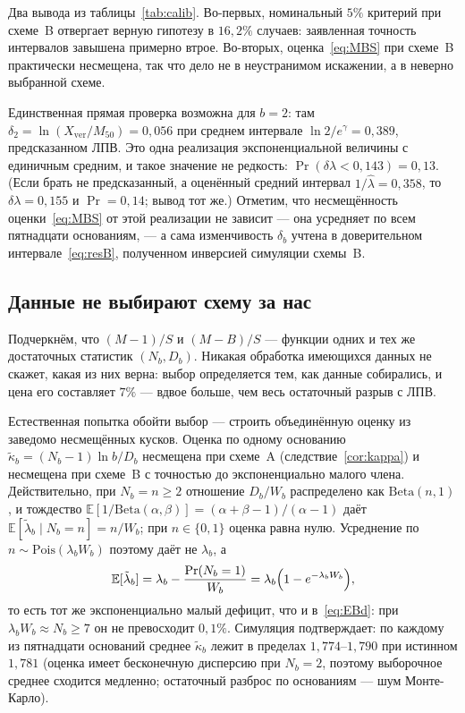 \documentclass[11pt,a4paper]{article}
\theoremstyle{plain}
\theoremstyle{remark}
\newcommand{\eg}{e^{\gamma}}
\begin{document}
Два вывода из таблицы~\ref{tab:calib}. Во-первых, номинальный $5\%$ критерий при
схеме~B отвергает верную гипотезу в $16{,}2\%$ случаев: заявленная точность интервалов
завышена примерно втрое. Во-вторых, оценка~\eqref{eq:MBS} при схеме~B практически
несмещена, так что дело не в неустранимом искажении, а в неверно выбранной схеме.

Единственная прямая проверка возможна для $b=2$: там
$\delta_2=\ln(X_{\mathrm{ver}}/M_{50})=0{,}056$ при среднем интервале
$\ln 2/\eg=0{,}389$, предсказанном ЛПВ.
Это одна реализация экспоненциальной величины с единичным средним, и такое значение
не редкость: $\Pr(\delta\lambda<0{,}143)=0{,}13$. (Если брать не предсказанный,
а оценённый средний интервал $1/\hat\lambda=0{,}358$, то $\delta\lambda=0{,}155$
и $\Pr=0{,}14$; вывод тот же.) Отметим, что несмещённость
оценки~\eqref{eq:MBS} от этой реализации не зависит --- она усредняет по всем
пятнадцати основаниям, --- а сама изменчивость $\delta_b$ учтена в доверительном
интервале~\eqref{eq:resB}, полученном инверсией симуляции схемы~B.

\subsection{Данные не выбирают схему за нас}\label{sec:noescape}

Подчеркнём, что $(M-1)/S$ и $(M-B)/S$ --- функции одних и тех же достаточных статистик
$(N_b,D_b)$. Никакая обработка имеющихся данных не скажет, какая из них верна: выбор
определяется тем, как данные собирались, и цена его составляет $7\%$ --- вдвое больше,
чем весь остаточный разрыв с ЛПВ.

Естественная попытка обойти выбор --- строить объединённую оценку из заведомо
несмещённых кусков.
Оценка по одному основанию $\tilde\kappa_b=(N_b-1)\ln b/D_b$ несмещена при схеме~A
(следствие~\ref{cor:kappa}) и несмещена при схеме~B с точностью до экспоненциально
малого члена. Действительно, при $N_b=n\ge2$ отношение $D_b/W_b$ распределено как
$\mathrm{Beta}(n,1)$, и тождество
$\mathbb E[1/\mathrm{Beta}(\alpha,\beta)]=(\alpha+\beta-1)/(\alpha-1)$ даёт
$\mathbb E[\tilde\lambda_b\mid N_b=n]=n/W_b$; при $n\in\{0,1\}$ оценка равна нулю.
Усреднение по $n\sim\mathrm{Pois}(\lambda_bW_b)$ поэтому даёт не $\lambda_b$, а
\[
  \mathbb E[\tilde\lambda_b]=\lambda_b-\frac{\Pr(N_b=1)}{W_b}
  =\lambda_b\Bigl(1-e^{-\lambda_bW_b}\Bigr),
\]
то есть тот же экспоненциально малый дефицит, что и в~\eqref{eq:EBd}: при
$\lambda_bW_b\approx N_b\ge7$ он не превосходит $0{,}1\%$. Симуляция подтверждает: по каждому из пятнадцати оснований среднее
$\tilde\kappa_b$ лежит в пределах $1{,}774$--$1{,}790$ при истинном $1{,}781$
(оценка имеет бесконечную дисперсию при $N_b=2$, поэтому выборочное среднее
сходится медленно; остаточный разброс по основаниям --- шум Монте-Карло).
\end{document}
